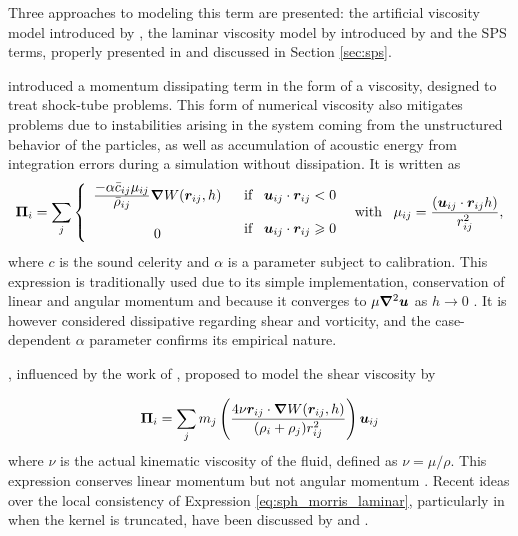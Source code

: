 Three approaches to modeling this term are presented: the artificial viscosity model introduced by \cite{Gingold-1982}, the laminar viscosity model by introduced by \cite{Morris-1997} and the \ac{SPS} terms, properly presented in \cite{Dalrymple-2006} and discussed in Section \ref{sec:sps}.

\cite{Gingold-1982} introduced a momentum dissipating term in the form of a viscosity, designed to treat shock-tube problems. This form of numerical viscosity also mitigates problems due to instabilities arising in the system coming from the unstructured behavior of the particles, as well as accumulation of acoustic energy from integration errors during a simulation without dissipation. It is written as
%
\begin{equation}
\begin{split} 
\label{eq:sph_artificial_visc_I}
{
\ve{\Pi} _{i}} = \sum_j\left\{ {\begin{array}{*{20}{c}}
  {\frac{ \displaystyle { - \alpha {{\bar c}_{ij}}{\mu _{ij}}}}{\displaystyle {{{\bar \rho }_{ij}}}}\ve{\nabla}W(\ve{r}_{ij}, h)} \\ \\
  0 
\end{array}} \right.{\text{    }}\begin{array}{*{20}{c}}
  \text{if}\;\;\;{{{\ve{u}}_{ij}}\cdot{{\ve{r}}_{ij}} < 0} \\ \\
  \text{if}\;\;\;{{{\ve{u}}_{ij}}\cdot{{\ve{r}}_{ij}} \geqslant 0} 
\end{array} \;\;\; 
\hbox{with} \;\;\; {\mu _{ij}} = \frac{{({{\ve{u}}_{ij}}\cdot{{\ve{r}}_{ij}}}h)}{{{{r}}_{ij}^2}},
\end{split}
\end{equation}
%
\noindent where $c$ is the sound celerity and $\alpha$ is a parameter subject to calibration. This expression is traditionally used due to its simple implementation, conservation of linear and angular momentum and because it converges to $\mu {\boldsymbol{\nabla}^2}{\boldsymbol{u}}$ as $h \rightarrow 0$ \citep{Issa-2004}. It is however considered dissipative regarding shear and vorticity, and the case-dependent $\alpha$ parameter confirms its empirical nature.

\cite{Morris-1997}, influenced by the work of \cite{Cleary-1996}, proposed to model the shear viscosity by 

\begin{equation} \label{eq:sph_morris_laminar}
	\boldsymbol{\Pi}_{i} = \sum_j m_j \left( \frac{4\nu \boldsymbol{r_}{ij} \cdot \boldsymbol{\nabla}W(\boldsymbol{r}_{ij}, h) }{(\rho_i + \rho_j){{r}}_{ij}^2} \right)\boldsymbol{u}_{ij} 
\end{equation}
%
where $\nu$ is the actual kinematic viscosity of the fluid, defined as $\nu=\mu/\rho$. This expression conserves linear momentum but not angular momentum \citep{Colagrossi-2011}. Recent ideas over the local consistency of Expression \eqref{eq:sph_morris_laminar}, particularly in when the kernel is truncated, have been discussed by \cite{Colagrossi-2011} and \cite{Gonzalez-2009}.


